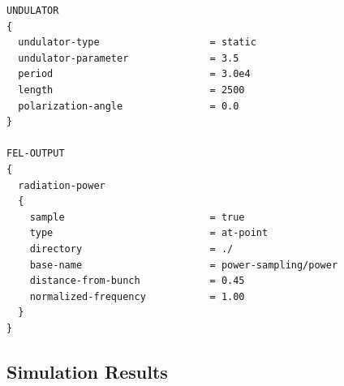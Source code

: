 \begin{snugshade}
\begin{Verbatim}[fontsize=\small, tabsize = 4]
UNDULATOR
{
  undulator-type                   = static
  undulator-parameter              = 3.5
  period                           = 3.0e4
  length                           = 2500
  polarization-angle               = 0.0
}

FEL-OUTPUT
{
  radiation-power
  {
    sample                         = true
    type                           = at-point
    directory                      = ./
    base-name                      = power-sampling/power
    distance-from-bunch            = 0.45
    normalized-frequency           = 1.00
  }
}
\end{Verbatim}
\end{snugshade}

\subsection{Simulation Results}

